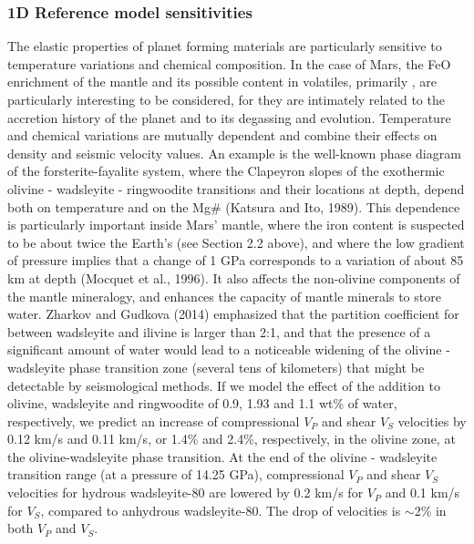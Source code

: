 \subsubsection{1D Reference model sensitivities} \label{1D_ref_sensitiviies}

The elastic properties of planet forming materials are particularly sensitive to temperature variations and chemical composition. In the case of Mars, the FeO enrichment of the mantle and its possible content in volatiles, primarily , are particularly interesting to be considered, for they are intimately related to the accretion history of the planet and to its degassing and evolution. Temperature and chemical variations are mutually dependent and combine their effects on density and seismic velocity values. An example is the well-known phase diagram of the forsterite-fayalite  system, where the Clapeyron slopes of the exothermic olivine - wadsleyite - ringwoodite transitions and their locations at depth, depend both on temperature and on the Mg\# (Katsura and Ito, 1989). This dependence is particularly important inside Mars' mantle, where the iron content is suspected to be about twice the Earth's (see Section 2.2 above), and where the low gradient of pressure implies that a change of 1 GPa corresponds to a variation of about 85 km at depth (Mocquet et al., 1996). It also affects the non-olivine components of the mantle mineralogy, and enhances the capacity of mantle minerals to store water.
Zharkov and Gudkova (2014) emphasized that the partition coefficient for  between wadsleyite and ilivine is larger than 2:1, and that the presence of a significant amount of water would lead to a noticeable widening of the olivine - wadsleyite phase transition zone (several tens of kilometers) that might be detectable by seismological methods. If we model the effect of the addition to olivine, wadsleyite and ringwoodite of 0.9, 1.93 and 1.1 wt\% of water, respectively, we predict an increase of compressional $V_P$ and shear $V_S$ velocities by 0.12 km/s and 0.11 km/s, or 1.4\% and 2.4\%, respectively, in the olivine zone,  at the olivine-wadsleyite phase transition. At the end of the olivine - wadsleyite transition range (at a pressure of 14.25 GPa), compressional $V_P$ and shear $V_S$ velocities for hydrous wadsleyite-80 are lowered by 0.2 km/s for $V_P$ and 0.1 km/s for $V_S$, compared to anhydrous wadsleyite-80. The drop of velocities is $\sim$2\% in both $V_P$ and $V_S$.

